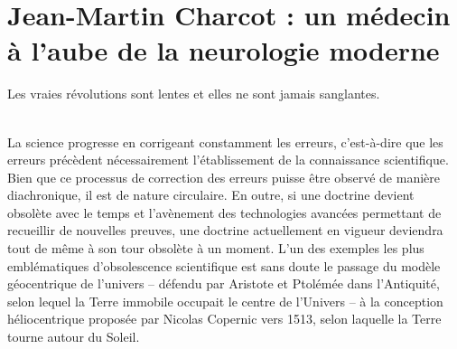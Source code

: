 \section{Jean-Martin Charcot : un médecin à l'aube de la neurologie moderne}
\begin{myepigraph}
\small
\og{}Les vraies révolutions sont lentes et elles ne sont jamais sanglantes.\fg{}\\[-1ex]
\\ 
\end{myepigraph}
\medskip
La science progresse en corrigeant constamment les erreurs, c'est-à-dire que les erreurs précèdent nécessairement l'établissement de la connaissance scientifique. Bien que ce processus de correction des erreurs puisse être observé de manière diachronique, il est de nature circulaire. En outre, si une doctrine devient obsolète avec le temps et l'avènement des technologies avancées permettant de recueillir de nouvelles preuves, une doctrine actuellement en vigueur deviendra tout de même à son tour obsolète à un moment. L'un des exemples les plus emblématiques d'obsolescence scientifique est sans doute le passage du modèle géocentrique de l'univers -- défendu par Aristote et Ptolémée dans l'Antiquité, selon lequel la Terre immobile occupait le centre de l'Univers -- à la conception héliocentrique proposée par Nicolas Copernic vers 1513, selon laquelle la Terre tourne autour du Soleil. 



